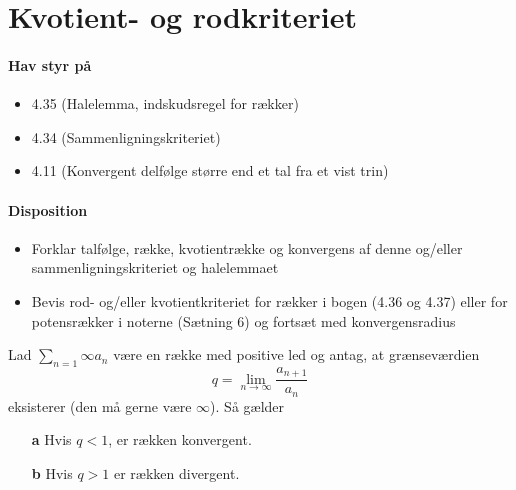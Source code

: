 \chapter{Kvotient- og rodkriteriet}
\subsubsection{Hav styr på}
\begin{itemize}
\setlength\itemsep{0em}
\item 4.35 (Halelemma, indskudsregel for rækker)
\item 4.34 (Sammenligningskriteriet)
\item 4.11 (Konvergent delfølge større end et tal fra et vist trin)
\end{itemize}
\subsubsection{Disposition}
\begin{itemize}
\setlength\itemsep{0em}
\item Forklar talfølge, række, kvotientrække og konvergens af denne og/eller sammenligningskriteriet og halelemmaet
\item Bevis rod- og/eller kvotientkriteriet for rækker i bogen (4.36 og 4.37) eller for potensrækker i noterne (Sætning 6) og fortsæt med konvergensradius
\end{itemize}
\clearpage
\begin{theorem}[Kvotientkriteriet]
Lad $\sum_{n=1}\infty a_n$ være en række med positive led og antag, at grænseværdien
\begin{equation}
q=\lim_{n\to\infty}\frac{a_{n+1}}{a_n}
\end{equation}
eksisterer (den må gerne være $\infty$). Så gælder
\begin{itemize}
\setlength\itemsep{0em}
\item[\textbf{a}] Hvis $q<1$, er rækken konvergent.
\item[\textbf{b}] Hvis $q>1$ er rækken divergent.
\end{itemize}
\end{theorem}
